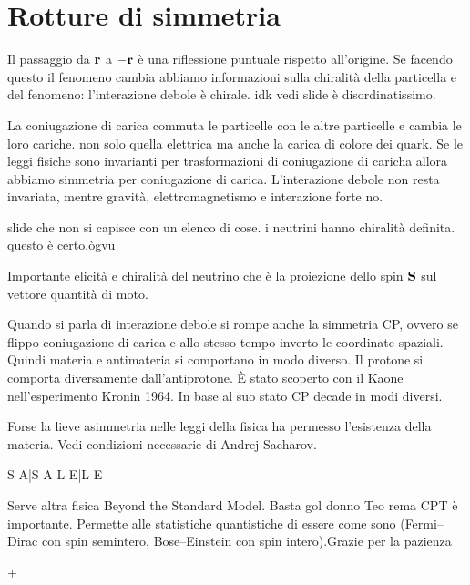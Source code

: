     \section{Rotture di simmetria}
        Il passaggio da $\vb{r}$ a $-\vb{r}$ è una riflessione puntuale rispetto all'origine. Se facendo questo il fenomeno cambia abbiamo informazioni sulla chiralità della particella e del fenomeno: l'interazione debole è chirale.
        idk vedi slide è disordinatissimo.        

        La coniugazione di carica commuta le particelle con le altre particelle e cambia le loro cariche. non solo quella elettrica ma anche la carica di colore dei quark. Se le leggi fisiche sono invarianti per trasformazioni di coniugazione di caricha allora abbiamo simmetria per coniugazione di carica. L'interazione debole non resta invariata, mentre gravità, elettromagnetismo e interazione forte no.

        slide che non si capisce con un elenco di cose. i neutrini hanno chiralità definita. questo è certo.ògvu

        Importante elicità e chiralità del neutrino che è la proiezione dello spin $\vb{S}$ sul vettore quantità di moto.

        Quando si parla di interazione debole si rompe anche la simmetria CP, ovvero se flippo coniugazione di carica e allo stesso tempo inverto le coordinate spaziali. Quindi materia e antimateria si comportano in modo diverso. Il protone si comporta diversamente dall'antiprotone. È stato scoperto con il Kaone nell'esperimento Kronin 1964. In base al suo stato CP decade in modi diversi.

        Forse la lieve asimmetria nelle leggi della fisica ha permesso l'esistenza della materia. Vedi condizioni necessarie di Andrej Sacharov.

        S A|S A
        L E|L E

        Serve altra fisica Beyond the Standard Model. Basta gol donno
        Teo rema CPT è importante. Permette alle statistiche quantistiche di essere come sono (Fermi--Dirac con spin semintero, Bose--Einstein con spin intero).Grazie per la pazienza
        
+
